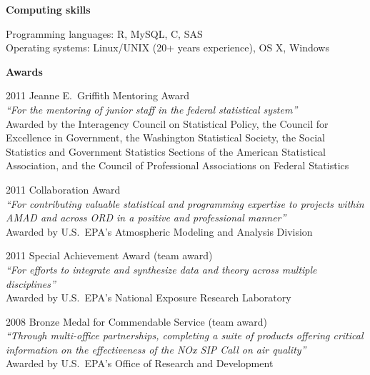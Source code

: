 \documentclass[11pt]{article}
\def\newsectn{\vspace*{0.8cm}}
\def\newitem{\vspace*{0.2cm}}
\begin{document}
\newpage


\noindent \textbf{Computing skills}

Programming languages:  R, MySQL, C, SAS\\
Operating systems: Linux/UNIX (20+ years experience), OS X, Windows





\newsectn
\noindent \textbf{Awards}

2011 Jeanne E.~Griffith Mentoring Award\\  %
\textit{``For the mentoring of junior staff in the federal statistical
  system''}\\
Awarded by the Interagency Council on Statistical
Policy, the Council for Excellence in Government, the Washington
Statistical Society, the Social Statistics and Government Statistics
Sections of the American Statistical Association, and the Council of
Professional Associations on Federal Statistics

\newitem
2011 Collaboration Award\\
\textit{``For contributing valuable statistical and programming expertise to projects within AMAD and across ORD in a positive and professional manner''}\\
Awarded by U.S.\ EPA's Atmospheric Modeling and Analysis Division

\newitem
2011 Special Achievement Award (team award)\\
\textit{``For efforts to integrate and synthesize data and theory across multiple disciplines''}\\
Awarded by U.S.\ EPA's National Exposure Research Laboratory 

\newitem
2008 Bronze Medal for Commendable Service (team award)\\
\textit{``Through multi-office partnerships, completing a suite
of products offering critical information on the effectiveness of the NOx SIP Call on air quality''}\\
Awarded by U.S.\ EPA's Office of Research and Development
\end{document}
